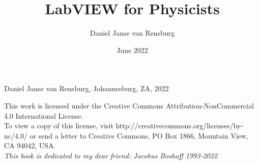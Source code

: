 \documentclass[a4paper,12pt]{book}
\begin{document}
\author{Daniel Janse van Rensburg}
\title{LabVIEW for Physicists}
\date{June 2022}

\frontmatter
\maketitle
\begin{center}
\textcopyright Daniel Janse van Rensburg, Johannesburg, ZA, 2022
\end{center}
\vfill
This work is licensed under the Creative Commons Attribution-NonCommercial 4.0 International License.\\ To view a copy of this license, visit http://creativecommons.org/licenses/by-nc/4.0/ or send a letter to Creative Commons, PO Box 1866, Mountain View, CA 94042, USA.\\
\newpage
\textit{This book is dedicated to my dear friend: Jacobus Boshoff 1993-2022}
\tableofcontents


\mainmatter





\backmatter
\end{document}
